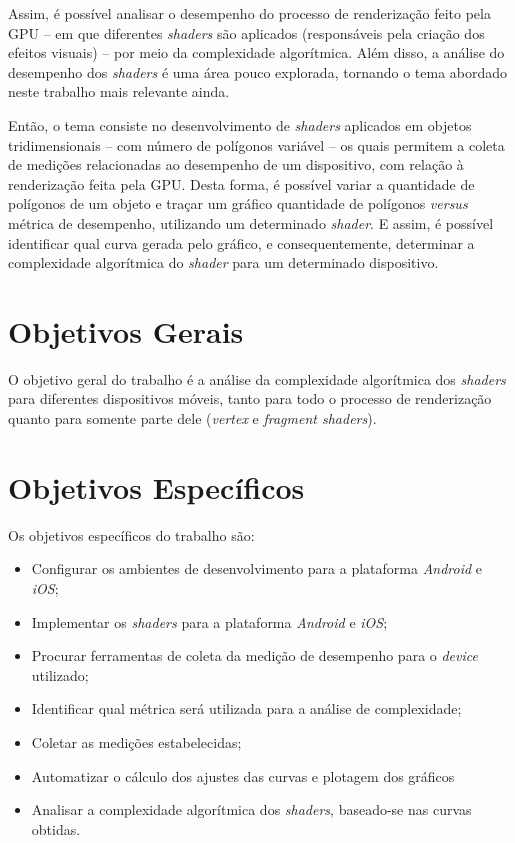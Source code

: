 	Assim, é possível analisar o desempenho do processo de renderização feito pela GPU -- em que diferentes \textit{shaders} são aplicados (responsáveis pela criação dos efeitos visuais) -- por meio da complexidade algorítmica. Além disso, a análise do desempenho dos \textit{shaders} é uma área pouco explorada, tornando o tema abordado neste trabalho mais relevante ainda. 

	Então, o tema consiste no desenvolvimento de \textit{shaders} aplicados em objetos tridimensionais -- com número de polígonos variável -- os quais permitem a coleta de medições relacionadas ao desempenho de um dispositivo, com relação à renderização feita pela GPU. Desta forma, é possível variar a quantidade de polígonos de um objeto e traçar um gráfico quantidade de polígonos \textit{versus} métrica de desempenho, utilizando um determinado \textit{shader}. E assim, é possível identificar qual curva gerada pelo gráfico, e consequentemente, determinar a complexidade algorítmica do \textit{shader} para um determinado dispositivo.  

\section{Objetivos Gerais}

O objetivo geral do trabalho é a análise da complexidade algorítmica dos \textit{shaders} para diferentes dispositivos móveis, tanto para todo o processo de renderização quanto para somente parte dele (\textit{vertex} e \textit{fragment shaders}).

\section{Objetivos Específicos}

Os objetivos específicos do trabalho são:

\begin{itemize}
 \item Configurar os ambientes de desenvolvimento para a plataforma \textit{Android} e \textit{iOS};
 \item Implementar os \textit{shaders} para a plataforma \textit{Android} e \textit{iOS};
\item Procurar ferramentas de coleta da medição de desempenho para o \textit{device} utilizado;
\item Identificar qual métrica será utilizada para a análise de complexidade;
\item Coletar as medições estabelecidas;
\item Automatizar o cálculo dos ajustes das curvas e plotagem dos gráficos
\item Analisar a complexidade algorítmica dos \textit{shaders}, baseado-se nas curvas obtidas.
\end{itemize}

